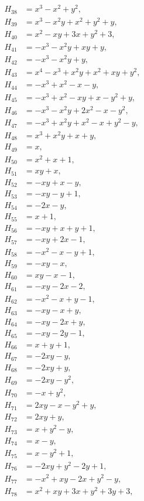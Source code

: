 \documentclass[11pt]{article}
\begin{document}
\begin{align*}
H_{38}&=x^{3}-x^{2}+y^{2},\\
H_{39}&=x^{3}-x^{2}y+x^{2}+y^{2}+y,\\
H_{40}&=x^{2}-xy+3x+y^{2}+3,\\
H_{41}&=-x^{3}-x^{2}y+xy+y,\\
H_{42}&=-x^{3}-x^{2}y+y,\\
H_{43}&=x^{4}-x^{3}+x^{2}y+x^{2}+xy+y^{2},\\
H_{44}&=-x^{3}+x^{2}-x-y,\\
H_{45}&=-x^{3}+x^{2}-xy+x-y^{2}+y,\\
H_{46}&=-x^{3}-x^{2}y+2x^{2}-x-y^{2},\\
H_{47}&=-x^{3}+x^{2}y+x^{2}-x+y^{2}-y,\\
H_{48}&=x^{3}+x^{2}y+x+y,\\
H_{49}&=x,\\
H_{50}&=x^{2}+x+1,\\
H_{51}&=xy+x,\\
H_{52}&=-xy+x-y,\\
H_{53}&=-xy-y+1,\\
H_{54}&=-2x-y,\\
H_{55}&=x+1,\\
H_{56}&=-xy+x+y+1,\\
H_{57}&=-xy+2x-1,\\
H_{58}&=-x^{2}-x-y+1,\\
H_{59}&=-xy-x,\\
H_{60}&=xy-x-1,\\
H_{61}&=-xy-2x-2,\\
H_{62}&=-x^{2}-x+y-1,\\
H_{63}&=-xy-x+y,\\
H_{64}&=-xy-2x+y,\\
H_{65}&=-xy-2y-1,\\
H_{66}&=x+y+1,\\
H_{67}&=-2xy-y,\\
H_{68}&=-2xy+y,\\
H_{69}&=-2xy-y^{2},\\
H_{70}&=-x+y^{2},\\
H_{71}&=2xy-x-y^{2}+y,\\
H_{72}&=2xy+y,\\
H_{73}&=x+y^{2}-y,\\
H_{74}&=x-y,\\
H_{75}&=x-y^{2}+1,\\
H_{76}&=-2xy+y^{2}-2y+1,\\
H_{77}&=-x^{2}+xy-2x+y^{2}-y,\\
H_{78}&=x^{2}+xy+3x+y^{2}+3y+3,\\

\end{align*}
\end{document}
